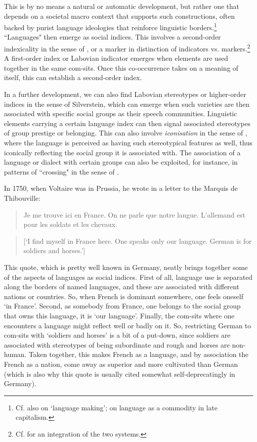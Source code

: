 This is by no means a natural or automatic development, but rather one that depends on a societal macro context that supports such constructions, often backed by purist language ideologies that reinforce linguistic borders.\footnote{Cf. also \citet{KrämerEtAl} on ‘language making’; \citet{HellerDuchêne2016} on language as a commodity in late capitalism.} “Languages" then emerge as social indices. This involves a second-order indexicality in the sense of \citet{Silverstein2003}, or a marker in  distinction of indicators vs. markers.\footnote{Cf. \citet{JohnstoneEtAl2006} for an integration of the two systems.} A first-order index or Labovian indicator emerges when elements are used together in the same com-sits. Once this co-occurrence takes on a meaning of itself, this can establish a second-order index.

In a further development, we can also find Labovian stereotypes or higher-order indices in the sense of Silverstein, which can emerge when such varieties are then associated with specific social groups as their speech communities. Linguistic elements carrying a certain language index can then signal associated stereotypes of group prestige or belonging. This can also involve \textit{iconisation} in the sense of \citet{IrvineGal2000}, where the language is perceived as having such stereotypical features as well, thus iconically reflecting the social group it is associated with. The association of a language or dialect with certain groups can also be exploited, for instance, in patterns of “crossing" in the sense of \citet{Rampton1995}.

 {In 1750}, when Voltaire was in Prussia, he wrote in a letter to the Marquis de Thibouville:

\begin{quote}
Je me trouve ici en France. On ne parle que notre langue. L’allemand est pour les soldats et les chevaux. \citep{Voltaire1750}
\end{quote}

\begin{quote}
[‘I find myself in France here. One speaks only our language. German is for soldiers and horses.’]
\end{quote}

This quote, which is pretty well known in Germany, neatly brings together some of the aspects of languages as social indices. First of all, language use is separated along the borders of named languages, and these are associated with different nations or countries. So, when French is dominant somewhere, one feels oneself `in France'. Second, as somebody from France, one belongs to the social group that owns this language, it is `our language'. Finally, the com-sits where one encounters a language might reflect well or badly on it. So, restricting German to com-sits with `soldiers and horses' is a bit of a put-down, since soldiers are associated with stereotypes of being subordinate and rough and horses are non-human. Taken together, this makes French as a language, and by association the French as a nation, come away as superior and more cultivated than German (which is also why this quote is usually cited somewhat self-deprecatingly in Germany).

